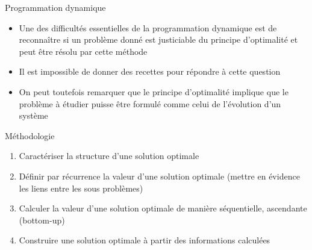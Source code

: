 \documentclass[aspectratio=1610,francais,envcountsect]{beamer}
\begin{document}
\begin{frame}{Programmation dynamique}

  \begin{itemize}
  \item Une des difficultés essentielles de la programmation dynamique
    est de reconnaître si un problème donné est justiciable du
    principe d’optimalité et peut être résolu par cette méthode
  
  \item Il est impossible de donner des recettes pour répondre à cette
    question

  \item On peut toutefois remarquer que le principe d’optimalité
    implique que le problème à étudier puisse être formulé comme celui
    de l’évolution d’un système
  \end{itemize}

  \begin{block}{Méthodologie}
    \begin{enumerate}
    \item Caractériser la structure d’une solution optimale
    \item Définir par récurrence la valeur d’une solution optimale
      (mettre en évidence les liens entre les sous problèmes)
    \item Calculer la valeur d’une solution optimale de manière
      séquentielle, ascendante (bottom-up)
    \item Construire une solution optimale à partir des informations
      calculées
    \end{enumerate}

  \end{block}

\end{frame}
\end{document}
